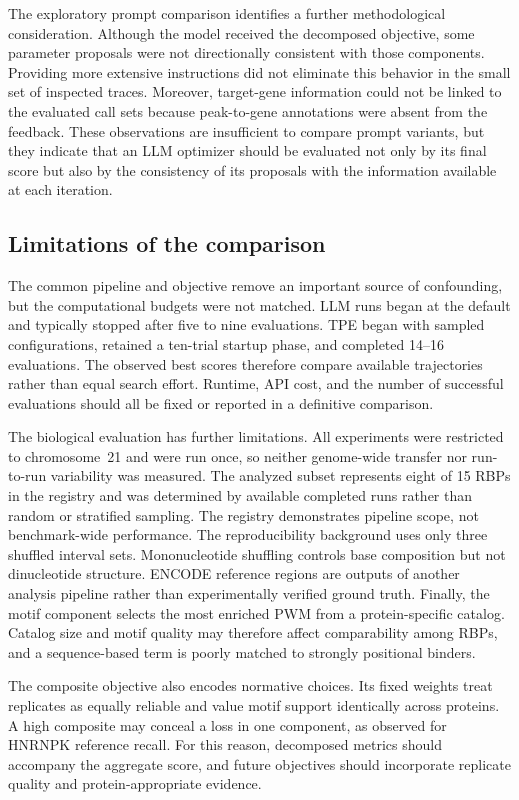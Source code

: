 The exploratory prompt comparison identifies a further methodological
consideration. Although the model received the decomposed objective, some
parameter proposals were not directionally consistent with those components.
Providing more extensive instructions did not eliminate this behavior in the
small set of inspected traces. Moreover, target-gene information could not be
linked to the evaluated call sets because peak-to-gene annotations were absent
from the feedback. These observations are insufficient to compare prompt
variants, but they indicate that an LLM optimizer should be evaluated not only
by its final score but also by the consistency of its proposals with the
information available at each iteration.

\subsection{Limitations of the comparison}

The common pipeline and objective remove an important source of confounding, but
the computational budgets were not matched. LLM runs began at the default and
typically stopped after five to nine evaluations. TPE began with sampled
configurations, retained a ten-trial startup phase, and completed 14--16
evaluations. The observed best scores therefore compare available trajectories
rather than equal search effort. Runtime, API cost, and the number of successful
evaluations should all be fixed or reported in a definitive comparison.

The biological evaluation has further limitations. All experiments were
restricted to chromosome~21 and were run once, so neither genome-wide transfer
nor run-to-run variability was measured. The analyzed subset represents eight of
15 RBPs in the registry and was determined by available completed runs rather
than random or stratified sampling. The registry demonstrates pipeline scope,
not benchmark-wide performance. The reproducibility background uses only
three shuffled interval sets. Mononucleotide shuffling controls base composition
but not dinucleotide structure. ENCODE reference regions are outputs of another
analysis pipeline rather than experimentally verified ground truth. Finally, the
motif component selects the most enriched PWM from a protein-specific catalog.
Catalog size and motif quality may therefore affect comparability among RBPs, and
a sequence-based term is poorly matched to strongly positional binders.

The composite objective also encodes normative choices. Its fixed weights treat
replicates as equally reliable and value motif support identically across
proteins. A high composite may conceal a loss in one component, as observed for
HNRNPK reference recall. For this reason, decomposed metrics should accompany the
aggregate score, and future objectives should incorporate replicate quality and
protein-appropriate evidence.

